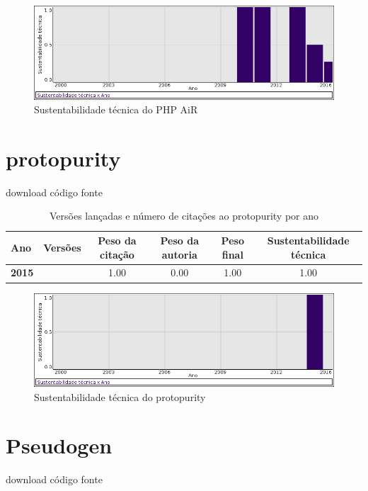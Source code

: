 \begin{figure}[h]
  \center
  \includegraphics[scale=0.50]{imagens/softwares-charts/php-air.png}
  \caption{Sustentabilidade técnica do PHP AiR}
\end{figure}


\section{protopurity}
\checkmark download
\checkmark código fonte


\begin{table}[H]
\caption{Versões lançadas e número de citações ao protopurity por ano}
\centering
\begin{tabular}{| l | c | c | c | c | c |}
  \hline
  Ano & Versões & Peso da citação & Peso da autoria & Peso final & Sustentabilidade técnica \\
  \hline
            {\bf 2015}
          &
          
          &
          1.00
          &
          0.00
          &
          1.00
          &
            {\color{blue} 1.00}
          \\
\hline
\end{tabular}
\end{table}

\begin{figure}[h]
  \center
  \includegraphics[scale=0.50]{imagens/softwares-charts/protopurity.png}
  \caption{Sustentabilidade técnica do protopurity}
\end{figure}


\section{Pseudogen}
\checkmark download
\checkmark código fonte


